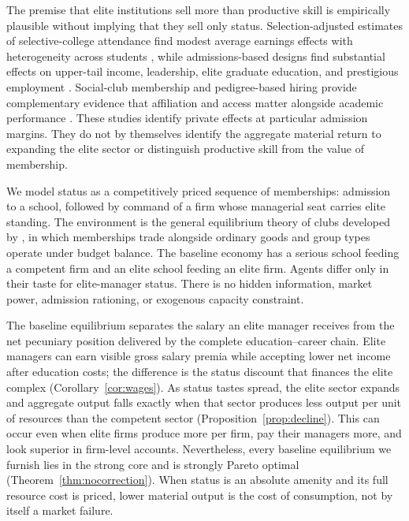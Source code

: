 \documentclass[12pt,letterpaper]{article}
\theoremstyle{definition}
\begin{document}
The premise that elite institutions sell more than productive skill is empirically
plausible without implying that they sell only status.
Selection-adjusted estimates of selective-college attendance find modest average earnings
effects with heterogeneity across students \citep{dalekrueger2002}, while admissions-based
designs find substantial effects on upper-tail income, leadership, elite graduate
education, and prestigious employment \citep{zimmerman2019elite,chettydemingfriedman2026}.
Social-club membership and pedigree-based hiring provide complementary evidence that
affiliation and access matter alongside academic performance
\citep{michelmanpricezimmerman2022,rivera2015pedigree}.
These studies identify private effects at particular admission margins.
They do not by themselves identify the aggregate material return to expanding the elite
sector or distinguish productive skill from the value of membership.

We model status as a competitively priced sequence of memberships: admission to a school,
followed by command of a firm whose managerial seat carries elite standing.
The environment is the general equilibrium theory of clubs developed by
\citet{ellickson1999clubs,ellickson2001clubs,ellickson2006organization}, in which
memberships trade alongside ordinary goods and group types operate under budget balance.
The baseline economy has a serious school feeding a competent firm and an elite school
feeding an elite firm.
Agents differ only in their taste for elite-manager status.
There is no hidden information, market power, admission rationing, or exogenous capacity
constraint.

The baseline equilibrium separates the salary an elite manager receives from the net
pecuniary position delivered by the complete education--career chain.
Elite managers can earn visible gross salary premia while accepting lower net income after
education costs; the difference is the status discount that finances the elite complex
(Corollary~\ref{cor:wages}).
As status tastes spread, the elite sector expands and aggregate output falls exactly when
that sector produces less output per unit of resources than the competent sector
(Proposition~\ref{prop:decline}).
This can occur even when elite firms produce more per firm, pay their managers more, and
look superior in firm-level accounts.
Nevertheless, every baseline equilibrium we furnish lies in the strong core and is
strongly Pareto optimal (Theorem~\ref{thm:nocorrection}).
When status is an absolute amenity and its full resource cost is priced, lower material
output is the cost of consumption, not by itself a market failure.
\end{document}
